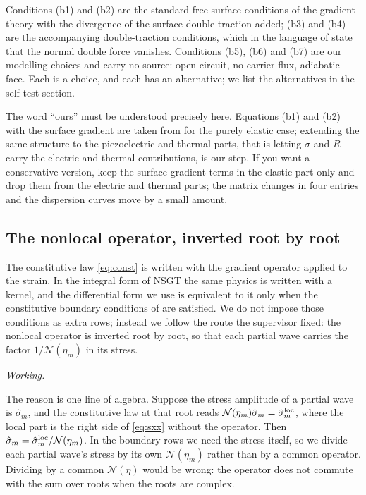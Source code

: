\documentclass[11pt,a4paper]{article}
\newif\ifshowworked \showworkedtrue
\newenvironment{worked}{\ifshowworked\par\smallskip\noindent\textit{Working.}\par\else\setbox0\vbox\bgroup\fi}{\ifshowworked\par\smallskip\else\egroup\fi}
\newcommand{\Nc}{\mathcal{N}}
\begin{document}
\noindent Conditions (b1) and (b2) are the standard free-surface conditions of the gradient theory with the
divergence of the surface double traction added; (b3) and (b4) are the accompanying double-traction
conditions, which in the language of \cite[condition b(i)]{Charalambopoulos2019} state that the normal
double force vanishes. Conditions (b5), (b6) and (b7) are our modelling choices and carry no source: open
circuit, no carrier flux, adiabatic face. Each is a choice, and each has an alternative; we list the
alternatives in the self-test section.

The word ``ours'' must be understood precisely here. Equations (b1) and (b2) with the surface gradient are
taken from \cite[Sec.~2, Eq.~(14)]{Charalambopoulos2019} for the purely elastic case; extending the same
structure to the piezoelectric and thermal parts, that is letting $\sigma$ and $R$ carry the electric and
thermal contributions, is our step. If you want a conservative version, keep the surface-gradient terms in
the elastic part only and drop them from the electric and thermal parts; the matrix changes in four entries
and the dispersion curves move by a small amount.

\subsection{The nonlocal operator, inverted root by root}

The constitutive law \eqref{eq:const} is written with the gradient operator applied to the strain. In the
integral form of NSGT the same physics is written with a kernel, and the differential form we use is
equivalent to it only when the constitutive boundary conditions of \cite[Eq.~(19)]{Barretta2018} are
satisfied. We do not impose those conditions as extra rows; instead we follow the route the supervisor
fixed: the nonlocal operator is inverted root by root, so that each partial wave carries the factor
$1/\Nc(\eta_m)$ in its stress.

\begin{worked}
The reason is one line of algebra. Suppose the stress amplitude of a partial wave is $\hat\sigma_m$, and the
constitutive law at that root reads $\Nc(\eta_m)\hat\sigma_m=\hat\sigma^{\rm loc}_m$, where the local part is
the right side of \eqref{eq:sxx} without the operator. Then $\hat\sigma_m=\hat\sigma^{\rm loc}_m/\Nc(\eta_m)$.
In the boundary rows we need the stress itself, so we divide each partial wave's stress by its own
$\Nc(\eta_m)$ rather than by a common operator. Dividing by a common $\Nc(\eta)$ would be wrong: the
operator does not commute with the sum over roots when the roots are complex.
\end{worked}
\end{document}
